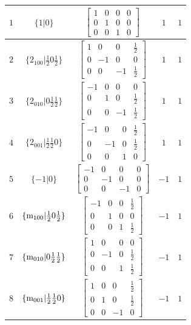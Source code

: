 \documentclass[fleqn,8pt]{jsarticle}
\begin{document}
\begin{longtable}{ccccc}
$ 1 $ & $ \{1|0\} $ & $ \begin{bmatrix} 1 & 0 & 0 & 0 \\ 0 & 1 & 0 & 0 \\ 0 & 0 & 1 & 0 \end{bmatrix} $ & $ 1 $ & $ 1 $ \\ \hline
$ 2 $ & $ \{2{}_{100}|\frac{1}{2} 0 \frac{1}{2}\} $ & $ \begin{bmatrix} 1 & 0 & 0 & \frac{1}{2} \\ 0 & -1 & 0 & 0 \\ 0 & 0 & -1 & \frac{1}{2} \end{bmatrix} $ & $ 1 $ & $ 1 $ \\ \hline
$ 3 $ & $ \{2{}_{010}|0 \frac{1}{2} \frac{1}{2}\} $ & $ \begin{bmatrix} -1 & 0 & 0 & 0 \\ 0 & 1 & 0 & \frac{1}{2} \\ 0 & 0 & -1 & \frac{1}{2} \end{bmatrix} $ & $ 1 $ & $ 1 $ \\ \hline
$ 4 $ & $ \{2{}_{001}|\frac{1}{2} \frac{1}{2} 0\} $ & $ \begin{bmatrix} -1 & 0 & 0 & \frac{1}{2} \\ 0 & -1 & 0 & \frac{1}{2} \\ 0 & 0 & 1 & 0 \end{bmatrix} $ & $ 1 $ & $ 1 $ \\ \hline
$ 5 $ & $ \{-1|0\} $ & $ \begin{bmatrix} -1 & 0 & 0 & 0 \\ 0 & -1 & 0 & 0 \\ 0 & 0 & -1 & 0 \end{bmatrix} $ & $ -1 $ & $ 1 $ \\ \hline
$ 6 $ & $ \{{\rm m}_{100}|\frac{1}{2} 0 \frac{1}{2}\} $ & $ \begin{bmatrix} -1 & 0 & 0 & \frac{1}{2} \\ 0 & 1 & 0 & 0 \\ 0 & 0 & 1 & \frac{1}{2} \end{bmatrix} $ & $ -1 $ & $ 1 $ \\ \hline
$ 7 $ & $ \{{\rm m}_{010}|0 \frac{1}{2} \frac{1}{2}\} $ & $ \begin{bmatrix} 1 & 0 & 0 & 0 \\ 0 & -1 & 0 & \frac{1}{2} \\ 0 & 0 & 1 & \frac{1}{2} \end{bmatrix} $ & $ -1 $ & $ 1 $ \\ \hline
$ 8 $ & $ \{{\rm m}_{001}|\frac{1}{2} \frac{1}{2} 0\} $ & $ \begin{bmatrix} 1 & 0 & 0 & \frac{1}{2} \\ 0 & 1 & 0 & \frac{1}{2} \\ 0 & 0 & -1 & 0 \end{bmatrix} $ & $ -1 $ & $ 1 $ \\ \hline

\end{longtable}
\end{document}
